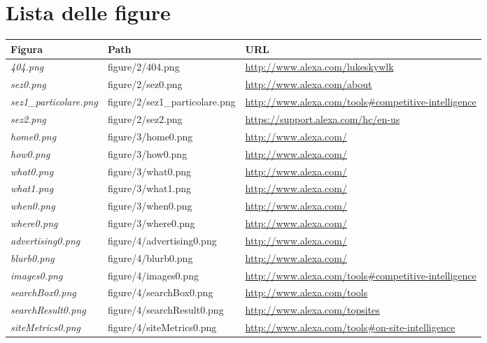 \section{Lista delle figure}\label{figlist}

\begin{longtable}{| p{4.15cm} | p{5cm} | p{6.5cm} |}

\hline
\hline
\textbf{Figura} & \textbf{Path} & \textbf{URL} \\ 
\hline
\hline

\textit{404.png} & figure/2/404.png & \url{http://www.alexa.com/lukeskywlk} \\
\hline
\textit{sez0.png} & figure/2/sez0.png & \url{http://www.alexa.com/about} \\
\hline
\textit{sez1\_particolare.png} & figure/2/sez1\_particolare.png & \url{http://www.alexa.com/tools#competitive-intelligence} \\
\hline
\textit{sez2.png} & figure/2/sez2.png & \url{https://support.alexa.com/hc/en-us} \\
\hline
\textit{home0.png} & figure/3/home0.png & \url{http://www.alexa.com/} \\
\hline
\textit{how0.png} & figure/3/how0.png & \url{http://www.alexa.com/} \\
\hline
\textit{what0.png} & figure/3/what0.png & \url{http://www.alexa.com/} \\
\hline
\textit{what1.png} & figure/3/what1.png & \url{http://www.alexa.com/} \\
\hline
\textit{when0.png} & figure/3/when0.png & \url{http://www.alexa.com/} \\
\hline
\textit{where0.png} & figure/3/where0.png & \url{http://www.alexa.com/} \\
\hline
\textit{advertising0.png} &  figure/4/advertising0.png & \url{http://www.alexa.com/} \\
\hline
\textit{blurb0.png} & figure/4/blurb0.png & \url{http://www.alexa.com/} \\
\hline
\textit{images0.png} & figure/4/images0.png & \url{http://www.alexa.com/tools#competitive-intelligence} \\
\hline
\textit{searchBox0.png} & figure/4/searchBox0.png & \url{http://www.alexa.com/tools} \\
\hline
\textit{searchResult0.png} & figure/4/searchResult0.png & \url{http://www.alexa.com/topsites} \\
\hline
\textit{siteMetrics0.png} & figure/4/siteMetrics0.png & \url{http://www.alexa.com/tools#on-site-intelligence} \\

\end{longtable}
